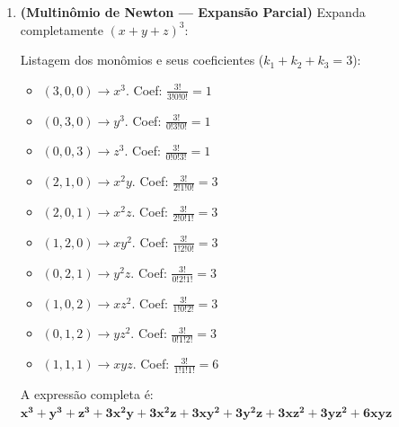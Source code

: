 \documentclass[12pt]{article}
\begin{document}
\begin{enumerate}
\begin{solucao}
A fórmula do coeficiente multinomial é $C = \dfrac{n!}{k_1!k_2!\dots k_m!}$.
\begin{enumerate}[label=\alph*)]
    \item \textbf{Coeficiente de $x^2 y^2 z$ em $(x + y + z)^5$:} \\
    $n=5, k_1=2, k_2=2, k_3=1$. \\
    $C = \frac{5!}{2!2!1!} = \frac{120}{2 \cdot 2 \cdot 1} = \frac{120}{4} = \mathbf{30}$

    \item \textbf{Coeficiente de $a^3 b^2 c$ em $(a + b + c)^6$:} \\
    $n=6, k_1=3, k_2=2, k_3=1$. \\
    $C = \frac{6!}{3!2!1!} = \frac{720}{6 \cdot 2 \cdot 1} = \frac{720}{12} = \mathbf{60}$

    \item \textbf{Coeficiente de $x^2 y z^2 w$ em $(x + y + z + w)^6$:} \\
    $n=6, k_1=2, k_2=1, k_3=2, k_4=1$. \\
    $C = \frac{6!}{2!1!2!1!} = \frac{720}{2 \cdot 1 \cdot 2 \cdot 1} = \frac{720}{4} = \mathbf{180}$
\end{enumerate}
\end{solucao}

\item \textbf{(Multinômio de Newton — Expansão Parcial)} Expanda completamente $(x + y + z)^3$:

\begin{solucao}
Listagem dos monômios e seus coeficientes ($k_1+k_2+k_3=3$):
\begin{itemize}
    \item $(3,0,0) \to x^3$. Coef: $\frac{3!}{3!0!0!} = 1$
    \item $(0,3,0) \to y^3$. Coef: $\frac{3!}{0!3!0!} = 1$
    \item $(0,0,3) \to z^3$. Coef: $\frac{3!}{0!0!3!} = 1$
    \item $(2,1,0) \to x^2y$. Coef: $\frac{3!}{2!1!0!} = 3$
    \item $(2,0,1) \to x^2z$. Coef: $\frac{3!}{2!0!1!} = 3$
    \item $(1,2,0) \to xy^2$. Coef: $\frac{3!}{1!2!0!} = 3$
    \item $(0,2,1) \to y^2z$. Coef: $\frac{3!}{0!2!1!} = 3$
    \item $(1,0,2) \to xz^2$. Coef: $\frac{3!}{1!0!2!} = 3$
    \item $(0,1,2) \to yz^2$. Coef: $\frac{3!}{0!1!2!} = 3$
    \item $(1,1,1) \to xyz$. Coef: $\frac{3!}{1!1!1!} = 6$
\end{itemize}
A expressão completa é: \\
$\mathbf{x^3 + y^3 + z^3 + 3x^2y + 3x^2z + 3xy^2 + 3y^2z + 3xz^2 + 3yz^2 + 6xyz}$
\end{solucao}

\end{enumerate}
\end{document}
